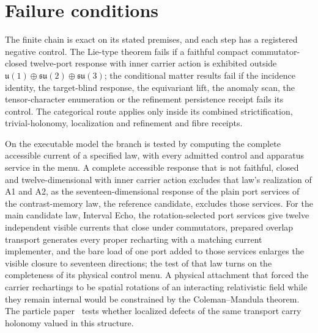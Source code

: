 \section{Failure conditions}
\label{sec:gauge-failure-conditions}

The finite chain is exact on its stated premises, and each step has a
registered negative control. The Lie-type theorem fails if a faithful
compact commutator-closed twelve-port response with inner carrier action is
exhibited outside
\(\mathfrak u(1)\oplus\mathfrak{su}(2)\oplus\mathfrak{su}(3)\); the
conditional matter results fail if the incidence identity, the target-blind
response, the equivariant lift, the anomaly scan, the tensor-character
enumeration or the refinement persistence receipt fails its control. The
categorical route applies only inside its combined strictification,
trivial-holonomy, localization and refinement and fibre receipts.

On the executable model the branch is tested by computing the complete
accessible current of a specified law, with every admitted control and
apparatus service in the menu. A complete accessible response that is not
faithful, closed and twelve-dimensional with inner carrier action excludes
that law's realization of A1 and A2, as the seventeen-dimensional response
of the plain port services of the contrast-memory law, the reference
candidate, excludes those services. For the main candidate law, Interval
Echo, the rotation-selected port services give twelve independent visible
currents that close under commutators, prepared overlap transport generates
every proper recharting with a matching current implementer, and the bare
load of one port added to those services enlarges the visible closure to
seventeen directions; the test of that law turns on the completeness of its
physical control menu. A physical attachment that forced the carrier
rechartings to be spatial rotations of an interacting relativistic field while
they remain internal would be constrained by the Coleman--Mandula theorem.
The particle paper~\cite{ophparticles} tests whether localized defects of the
same transport carry holonomy valued in this structure.
